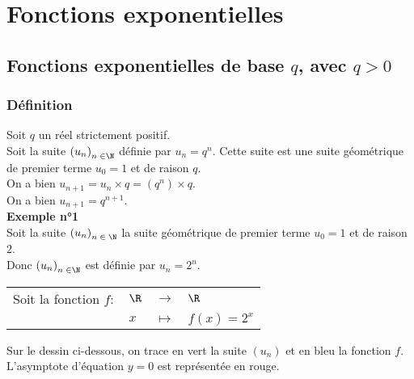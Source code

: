 \ifdefined\COMPLETE
\else
    
    
    \usepackage{variations}

    
\fi


\vspace*{-2cm}

\section{Fonctions exponentielles}

\subsection{Fonctions exponentielles de base $q$, avec $q > 0$}

\subsubsection{Définition}

Soit $q$ un réel strictement positif. \\
Soit la suite $\left(u_n\right)_{n\; \in \N}$ définie par $u_n = q^n$. Cette suite est une suite géométrique de premier terme $u_0 = 1$ et de raison $q$. \\

On a bien $u_{n+1} = u_n \times q = \left(q^n\right) \times q$. \\
On a bien $u_{n+1} = q^{n+1}$. \\

\textbf{Exemple n°1} \\

Soit la suite $\left(u_n\right)_{n\; \in \; \N}$ la suite géométrique de premier terme $u_0 = 1$ et de raison $2$.\\ Donc $\left(u_n\right)_{n \; \in \N}$ est définie par $u_n = 2^n$. \\

\begin{tabular}{llll}
\hspace*{-.3cm} Soit la fonction $f:$ & $\R$ & $\longrightarrow$ & $\R$ \\
& $x$ & $\longmapsto$ & $f(x) = 2^x$ \\
\end{tabular}

\vspace*{.3cm}

Sur le dessin ci-dessous, on trace en vert la suite $\left(u_n\right)$ et en bleu la fonction $f$. \\
L'asymptote d'équation $y = 0$ est représentée en rouge. \\

